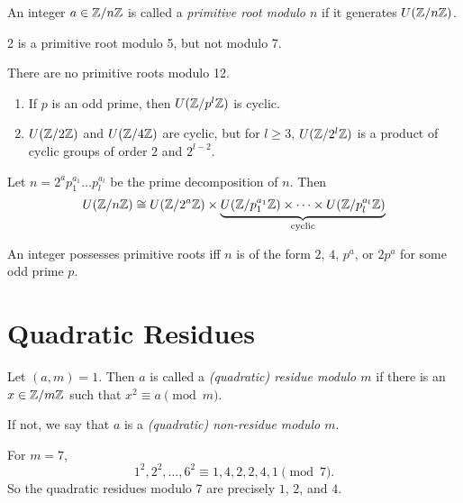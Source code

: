 \begin{definition} \label{def:nt:primitive_root}
    An integer $a \in \mathbb{Z}/n\mathbb{Z}$ is called a \emph{primitive root modulo $n$}
    if it generates $U(\mathbb{Z}/n\mathbb{Z})$.
\end{definition}
\begin{examples}
    \item 2 is a primitive root modulo 5, but not modulo 7.
    \item There are no primitive roots modulo 12.
\end{examples}

\begin{fact} \label{thm:nt:facts} \leavevmode
    \begin{enumerate}
        \item If $p$ is an odd prime, then $U(\mathbb{Z}/p^l\mathbb{Z})$ is cyclic.
        \item $U(\mathbb{Z}/2\mathbb{Z})$ and $U(\mathbb{Z}/4\mathbb{Z})$ are cyclic, but for $l \ge 3$,
        $U(\mathbb{Z}/2^l\mathbb{Z})$ is a product of cyclic groups of order
        $2$ and $2^{l-2}$.
    \end{enumerate}
\end{fact}

\begin{theorem}
    Let $n = 2^a p_1^{a_1} \dots p_l^{a_l}$ be the prime decomposition
    of $n$.
    Then \[
        U(\mathbb{Z}/n\mathbb{Z}) \cong U(\mathbb{Z}/2^a\mathbb{Z}) \times \underbrace{U(\mathbb{Z}/p_1^{a_1}\mathbb{Z}) \times \dots \times U(\mathbb{Z}/p_l^{a_l}\mathbb{Z})}_{\text{cyclic}}
    \]
\end{theorem}
\begin{corollary}
    An integer possesses primitive roots iff $n$ is of the form $2$, $4$,
    $p^a$, or $2p^a$ for some odd prime $p$.
\end{corollary}

\chapter{Quadratic Residues} \label{chp:quad_res}
\begin{definition} \label{def:quad_res}
    Let $(a, m) = 1$.
    Then $a$ is called a \emph{(quadratic) residue modulo $m$} if there
    is an $x \in \mathbb{Z}/m\mathbb{Z}$ such that $x^2 \equiv a \pmod{m}$.

    If not, we say that $a$ is a \emph{(quadratic) non-residue modulo $m$}.
\end{definition}
\begin{example}
    For $m = 7$, \[
        1^2, 2^2, \dots, 6^2 \equiv 1, 4, 2, 2, 4, 1 \pmod{7}.
    \] So the quadratic residues modulo 7 are precisely $1$, $2$, and $4$.
\end{example}

